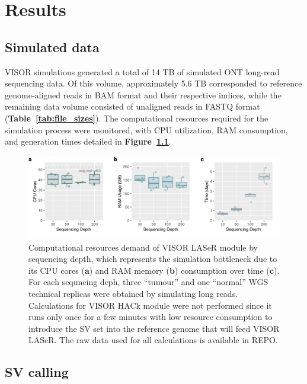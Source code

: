 \chapter{Results}

\section{Simulated data}

VISOR simulations generated a total of 14 TB of simulated ONT long-read 
sequencing data. Of this volume, approximately 5.6 TB corresponded to reference 
genome-aligned reads in BAM format and their respective indices, while the 
remaining data volume consisted of unaligned reads in FASTQ format 
(\textbf{Table~\ref{tab:file_sizes}}). The computational resources required for 
the simulation process were monitored, with CPU utilization, RAM consumption, 
and generation times detailed in \textbf{Figure~\ref{fig:hpc_visor_laser}}.

\begin{figure}[H]
    \centering
    \includegraphics[width=\textwidth]{data/cluster_bmk/hpc_visor_laser.pdf}
    \caption[Computational resources demand of VISOR LASeR module]{Computational 
    resources demand of VISOR LASeR module by sequencing depth, which represents 
    the simulation bottleneck due to its CPU cores (\textbf{a}) and RAM memory 
    (\textbf{b}) consumption over time (\textbf{c}). For each sequncing deph, 
    three ``tumour'' and one ``normal'' WGS technical replicas were obtained 
    by simulating long reads. Calculations for VISOR HACk module were not 
    performed since it runs only once for a few minutes with low resource 
    consumption to introduce the SV set into the reference genome that will 
    feed VISOR LASeR. The raw data used for all calculations is available in REPO.}
    \label{fig:hpc_visor_laser}
\end{figure}

\section{SV calling}

